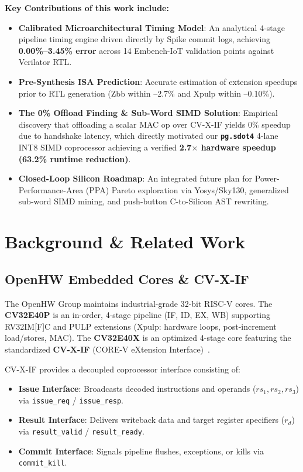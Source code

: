 \documentclass[conference]{IEEEtran}
\begin{document}
\noindent\textbf{Key Contributions of this work include:}
\begin{itemize}
    \item \textbf{Calibrated Microarchitectural Timing Model}: An analytical 4-stage pipeline timing engine driven directly by Spike commit logs, achieving \textbf{0.00\%--3.45\% error} across 14 Embench-IoT validation points against Verilator RTL.
    \item \textbf{Pre-Synthesis ISA Prediction}: Accurate estimation of extension speedups prior to RTL generation (Zbb within --2.7\% and Xpulp within --0.10\%).
    \item \textbf{The 0\% Offload Finding \& Sub-Word SIMD Solution}: Empirical discovery that offloading a scalar MAC op over CV-X-IF yields 0\% speedup due to handshake latency, which directly motivated our \textbf{\texttt{pg.sdot4}} 4-lane INT8 SIMD coprocessor achieving a verified \textbf{2.7$\times$ hardware speedup (63.2\% runtime reduction)}.
    \item \textbf{Closed-Loop Silicon Roadmap}: An integrated future plan for Power-Performance-Area (PPA) Pareto exploration via Yosys/Sky130, generalized sub-word SIMD mining, and push-button C-to-Silicon AST rewriting.
\end{itemize}

\section{Background \& Related Work}

\subsection{OpenHW Embedded Cores \& CV-X-IF}
The OpenHW Group maintains industrial-grade 32-bit RISC-V cores. The \textbf{CV32E40P} is an in-order, 4-stage pipeline (IF, ID, EX, WB) supporting RV32IM[F]C and PULP extensions (Xpulp: hardware loops, post-increment load/stores, MAC). The \textbf{CV32E40X} is an optimized 4-stage core featuring the standardized \textbf{CV-X-IF} (CORE-V eXtension Interface)~\cite{openhw_xif}.

CV-X-IF provides a decoupled coprocessor interface consisting of:
\begin{itemize}
    \item \textbf{Issue Interface}: Broadcasts decoded instructions and operands ($rs_1, rs_2, rs_3$) via \texttt{issue\_req} / \texttt{issue\_resp}.
    \item \textbf{Result Interface}: Delivers writeback data and target register specifiers ($r_d$) via \texttt{result\_valid} / \texttt{result\_ready}.
    \item \textbf{Commit Interface}: Signals pipeline flushes, exceptions, or kills via \texttt{commit\_kill}.
\end{itemize}
\end{document}
